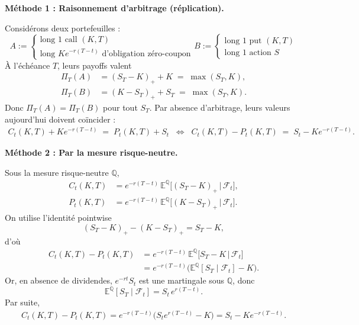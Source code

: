 \textbf{Méthode 1 : Raisonnement d'arbitrage (réplication).}

Considérons deux portefeuilles :
\[
A := \begin{cases}
\text{long } 1 \text{ call } (K,T) \\
\text{long } K e^{-r(T-t)} \text{ d'obligation zéro-coupon}
\end{cases}
B :=  \begin{cases}
\text{long } 1 \text{ put } (K,T) \\
\text{long } 1 \text{ action } S
\end{cases}
\]
À l'échéance $T$, leurs payoffs valent
\begin{align*}
\Pi_T(A) &= (S_T - K)_+ + K \;=\; \max(S_T, K),\\
\Pi_T(B) &= (K - S_T)_+ + S_T \;=\; \max(S_T, K).
\end{align*}
Donc $\Pi_T(A)=\Pi_T(B)$ pour tout $S_T$. Par absence d'arbitrage, leurs valeurs aujourd'hui doivent coïncider :
\begin{align*}
C_t(K,T) + K e^{-r(T-t)} \;=\; P_t(K,T) + S_t
\;\;\Longleftrightarrow\;\;
C_t(K,T) - P_t(K,T) \;=\; S_t - K e^{-r(T-t)}.
\end{align*}


\textbf{Méthode 2 : Par la mesure risque-neutre.}

Sous la mesure risque-neutre $\mathbb{Q}$,
\begin{align*}
C_t(K,T) &= e^{-r(T-t)}\,\mathbb{E}^{\mathbb{Q}}\!\big[(S_T - K)_+ \,\big|\, \mathcal{F}_t\big],\\
P_t(K,T) &= e^{-r(T-t)}\,\mathbb{E}^{\mathbb{Q}}\!\big[(K - S_T)_+ \,\big|\, \mathcal{F}_t\big].
\end{align*}
On utilise l'identité pointwise
\[
(S_T - K)_+ - (K - S_T)_+ = S_T - K,
\]
d’où
\begin{align*}
C_t(K,T) - P_t(K,T)
&= e^{-r(T-t)}\,\mathbb{E}^{\mathbb{Q}}\!\big[S_T - K \,\big|\, \mathcal{F}_t\big] \\
&= e^{-r(T-t)}\Big(\mathbb{E}^{\mathbb{Q}}[S_T \mid \mathcal{F}_t] - K\Big).
\end{align*}
Or, en absence de dividendes, $e^{-rt}S_t$ est une martingale sous $\mathbb{Q}$, donc
\[
\mathbb{E}^{\mathbb{Q}}[S_T \mid \mathcal{F}_t] = S_t\,e^{r(T-t)}.
\]
Par suite,
\begin{align*}
C_t(K,T) - P_t(K,T)
= e^{-r(T-t)}\big(S_t e^{r(T-t)} - K\big)
= S_t - K e^{-r(T-t)}.
\end{align*}

